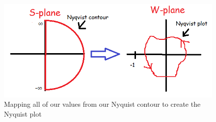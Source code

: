 \begin{newtext}






\begin{figure}[h!]
    \centering
    \includegraphics[scale= 0.4]{Images/nykv.PNG}
    \caption{Mapping all of our values from our Nyquist contour to create the Nyquist plot}
    \label{Nyqvist}
\end{figure}





\end{newtext}